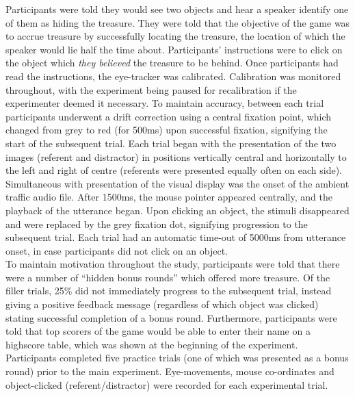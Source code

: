 \documentclass[a4paper,man,natbib]{apa6}
\begin{document}
Participants were told they would see two objects and hear a speaker identify one of them as hiding the treasure. 
They were told that the objective of the game was to accrue treasure by successfully locating the treasure, the location of which the speaker would lie half the time about. Participants' instructions were to click on the object which \textit{they believed} the treasure to be behind. 
Once participants had read the instructions, the eye-tracker was calibrated.
Calibration was monitored throughout, with the experiment being paused for recalibration if the experimenter deemed it necessary.
To maintain accuracy, between each trial participants underwent a drift correction using a central fixation point, which changed from grey to red (for 500ms) upon successful fixation, signifying the start of the subsequent trial. 
Each trial began with the presentation of the two images (referent and distractor) in positions vertically central and horizontally to the left and right of centre (referents were presented equally often on each side). 
Simultaneous with presentation of the visual display was the onset of the ambient traffic audio file. 
After 1500ms, the mouse pointer appeared centrally, and the playback of the utterance began. 
Upon clicking an object, the stimuli disappeared and were replaced by the grey fixation dot, signifying progression to the subsequent trial. 
Each trial had an automatic time-out of 5000ms from utterance onset, in case participants did not click on an object.\\

To maintain motivation throughout the study, participants were told that there were a number of ``hidden bonus rounds'' which offered more treasure. 
Of the filler trials, 25\% did not immediately progress to the subsequent trial, instead giving a positive feedback message (regardless of which object was clicked) stating successful completion of a bonus round. 
Furthermore, participants were told that top scorers of the game would be able to enter their name on a highscore table, which was shown at the beginning of the experiment. 
Participants completed five practice trials (one of which was presented as a bonus round) prior to the main experiment. 
Eye-movements, mouse co-ordinates and object-clicked (referent/distractor) were recorded for each experimental trial.\\
\end{document}
